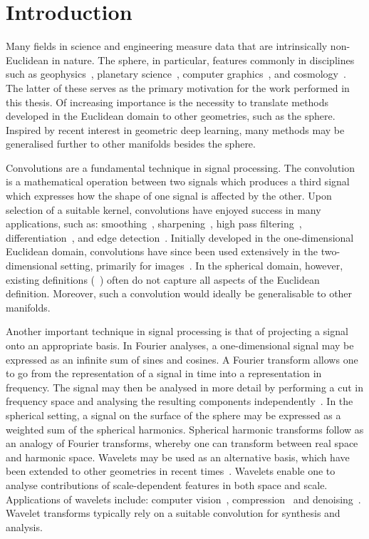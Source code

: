 \chapter{Introduction}\label{sec:chapter1}

Many fields in science and engineering measure data that are intrinsically non-Euclidean in nature.
The sphere, in particular, features commonly in disciplines such as geophysics~\cite{Simons2006}, planetary science~\cite{Turcotte1981}, computer graphics~\cite{Ramamoorthi2004}, and cosmology~\cite{Bennett1996}.
The latter of these serves as the primary motivation for the work performed in this thesis.
Of increasing importance is the necessity to translate methods developed in the Euclidean domain to other geometries, such as the sphere.
Inspired by recent interest in geometric deep learning, many methods may be generalised further to other manifolds besides the sphere.

Convolutions are a fundamental technique in signal processing.
The convolution is a mathematical operation between two signals which produces a third signal which expresses how the shape of one signal is affected by the other.
Upon selection of a suitable kernel, convolutions have enjoyed success in many applications, such as: smoothing~\cite{Gorry1990}, sharpening~\cite{Hu2020}, high pass filtering~\cite{Huang2009}, differentiation~\cite{Gorry1990}, and edge detection~\cite{Shen1996}.  %
Initially developed in the one-dimensional Euclidean domain, convolutions have since been used extensively in the two-dimensional setting, primarily for images~\cite{Rahmouni2017,Unser1995,Sahiner1996,Kumar2020}.  %
In the spherical domain, however, existing definitions (\eg{}~\cite{McEwen2007,Wei2011,Kennedy2011,Kennedy2011,Driscoll1994,Wandelt2001,Sadeghi2012,Khalid2012}) often do not capture all aspects of the Euclidean definition.
Moreover, such a convolution would ideally be generalisable to other manifolds.

Another important technique in signal processing is that of projecting a signal onto an appropriate basis.
In Fourier analyses, a one-dimensional signal may be expressed as an infinite sum of sines and cosines.
A Fourier transform allows one to go from the representation of a signal in time into a representation in frequency.
The signal may then be analysed in more detail by performing a cut in frequency space and analysing the resulting components independently~\cite{Mallat2008}.
In the spherical setting, a signal on the surface of the sphere may be expressed as a weighted sum of the spherical harmonics.
Spherical harmonic transforms follow as an analogy of Fourier transforms, whereby one can transform between real space and harmonic space.
Wavelets may be used as an alternative basis, which have been extended to other geometries in recent times~\cite{Pen1999,Barreiro2001,Rocha2004,McEwen2004,Audet2011,Audet2014,Loris2010,Simons2011,Simons2011b}.
Wavelets enable one to analyse contributions of scale-dependent features in both space and scale.
Applications of wavelets include: computer vision~\cite{Shi1997}, compression~\cite{Antonini1990,Mallat1992} and denoising~\cite{Mittermayr1996}.
Wavelet transforms typically rely on a suitable convolution for synthesis and analysis.


